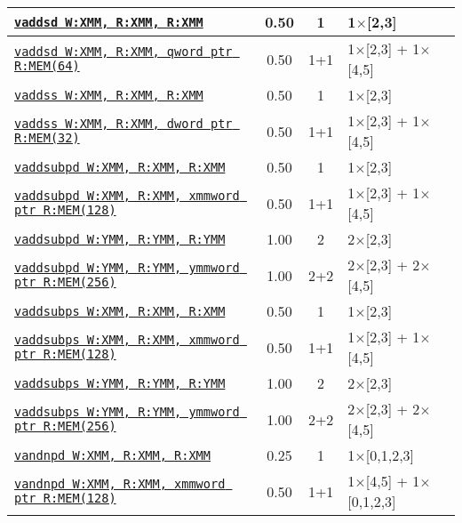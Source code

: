 \documentclass[a4paper,english,fontsize=9]{scrartcl}
\begin{document}
\begin{longtable}{p{}ccL{.25\textwidth}}
  \midrule
  \texttt{\href{https://felixcloutier.com/x86/ADDSD.html}{vaddsd W:XMM, R:XMM, R:XMM}} & 0.50 & 1 & 1\(\times\)[2,3] \\
  \midrule
  \texttt{\href{https://felixcloutier.com/x86/ADDSD.html}{vaddsd W:XMM, R:XMM, qword ptr R:MEM(64)}} & 0.50 & 1+1 & 1\(\times\)[2,3] + 1\(\times\)[4,5] \\
  \midrule
  \texttt{\href{https://felixcloutier.com/x86/ADDSS.html}{vaddss W:XMM, R:XMM, R:XMM}} & 0.50 & 1 & 1\(\times\)[2,3] \\
  \midrule
  \texttt{\href{https://felixcloutier.com/x86/ADDSS.html}{vaddss W:XMM, R:XMM, dword ptr R:MEM(32)}} & 0.50 & 1+1 & 1\(\times\)[2,3] + 1\(\times\)[4,5] \\
  \midrule
  \texttt{\href{https://felixcloutier.com/x86/ADDSUBPD.html}{vaddsubpd W:XMM, R:XMM, R:XMM}} & 0.50 & 1 & 1\(\times\)[2,3] \\
  \midrule
  \texttt{\href{https://felixcloutier.com/x86/ADDSUBPD.html}{vaddsubpd W:XMM, R:XMM, xmmword ptr R:MEM(128)}} & 0.50 & 1+1 & 1\(\times\)[2,3] + 1\(\times\)[4,5] \\
  \midrule
  \texttt{\href{https://felixcloutier.com/x86/ADDSUBPD.html}{vaddsubpd W:YMM, R:YMM, R:YMM}} & 1.00 & 2 & 2\(\times\)[2,3] \\
  \midrule
  \texttt{\href{https://felixcloutier.com/x86/ADDSUBPD.html}{vaddsubpd W:YMM, R:YMM, ymmword ptr R:MEM(256)}} & 1.00 & 2+2 & 2\(\times\)[2,3] + 2\(\times\)[4,5] \\
  \midrule
  \texttt{\href{https://felixcloutier.com/x86/ADDSUBPS.html}{vaddsubps W:XMM, R:XMM, R:XMM}} & 0.50 & 1 & 1\(\times\)[2,3] \\
  \midrule
  \texttt{\href{https://felixcloutier.com/x86/ADDSUBPS.html}{vaddsubps W:XMM, R:XMM, xmmword ptr R:MEM(128)}} & 0.50 & 1+1 & 1\(\times\)[2,3] + 1\(\times\)[4,5] \\
  \midrule
  \texttt{\href{https://felixcloutier.com/x86/ADDSUBPS.html}{vaddsubps W:YMM, R:YMM, R:YMM}} & 1.00 & 2 & 2\(\times\)[2,3] \\
  \midrule
  \texttt{\href{https://felixcloutier.com/x86/ADDSUBPS.html}{vaddsubps W:YMM, R:YMM, ymmword ptr R:MEM(256)}} & 1.00 & 2+2 & 2\(\times\)[2,3] + 2\(\times\)[4,5] \\
  \midrule
  \texttt{\href{https://felixcloutier.com/x86/ANDNPD.html}{vandnpd W:XMM, R:XMM, R:XMM}} & 0.25 & 1 & 1\(\times\)[0,1,2,3] \\
  \midrule
  \texttt{\href{https://felixcloutier.com/x86/ANDNPD.html}{vandnpd W:XMM, R:XMM, xmmword ptr R:MEM(128)}} & 0.50 & 1+1 & 1\(\times\)[4,5] + 1\(\times\)[0,1,2,3] \\

\end{longtable}
\end{document}
